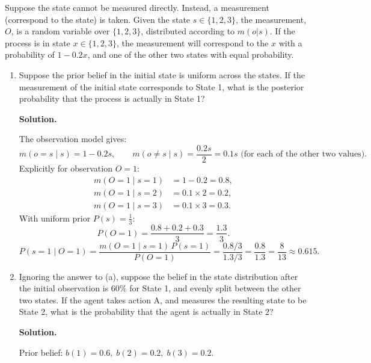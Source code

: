 \documentclass[12pt]{article}
\newenvironment{solution}{%
  \ifshowsolutions\begin{solutionbox}\noindent\textbf{\color{blue!70!black}Solution.}\quad\fi
  \ifshowsolutions\else\expandafter\comment\fi
}{%
  \ifshowsolutions\end{solutionbox}\fi
  \ifshowsolutions\else\expandafter\endcomment\fi
}
\begin{document}
\begin{enumerate}
\begin{figure}[H]
\begin{tikzpicture}[
              auto,
              node distance = 2cm,
              semithick
            ]
          \end{tikzpicture}
        \end{figure}
        Suppose the state cannot be measured directly. Instead, a measurement (correspond to the state) is taken. Given the state $s \in \lbrace 1, 2, 3 \rbrace$, the measurement, $O$, is a random variable over $\lbrace 1, 2, 3 \rbrace$, distributed according to $m(o|s)$. If the process is in state $x \in \lbrace 1, 2, 3 \rbrace$, the measurement will correspond to the $x$ with a probability of $1 - 0.2x$, and one of the other two states with equal probability.
\begin{enumerate}
  \item Suppose the prior belief in the initial state is uniform across the states. If the measurement of the initial state corresponds to State 1, what is the posterior probability that the process is actually in State 1?

  \begin{solution}
    The observation model gives:
    \[
      m(o=s \mid s) = 1 - 0.2s, \qquad
      m(o \neq s \mid s) = \frac{0.2s}{2} = 0.1s \text{ (for each of the other two values)}.
    \]
    Explicitly for observation $O=1$:
    \begin{align*}
      m(O=1 \mid s=1) &= 1 - 0.2 = 0.8,\\
      m(O=1 \mid s=2) &= 0.1\times 2 = 0.2,\\
      m(O=1 \mid s=3) &= 0.1\times 3 = 0.3.
    \end{align*}
    With uniform prior $P(s) = \tfrac{1}{3}$:
    \[
      P(O=1) = \frac{0.8 + 0.2 + 0.3}{3} = \frac{1.3}{3}.
    \]
    \[
      P(s=1 \mid O=1) = \frac{m(O=1\mid s=1)\,P(s=1)}{P(O=1)}
                      = \frac{0.8/3}{1.3/3} = \frac{0.8}{1.3} = \frac{8}{13} \approx 0.615.
    \]
  \end{solution}

  \item Ignoring the answer to (a), suppose the belief in the state distribution after the initial observation is $60\%$ for State 1, and evenly split between the other two states. If the agent takes action $\text{A}$, and measures the resulting state to be State 2, what is the probability that the agent is actually in State 2?

  \begin{solution}
    Prior belief: $b(1)=0.6,\;b(2)=0.2,\;b(3)=0.2$.


\end{solution}
\end{enumerate}
\end{enumerate}
\end{document}
